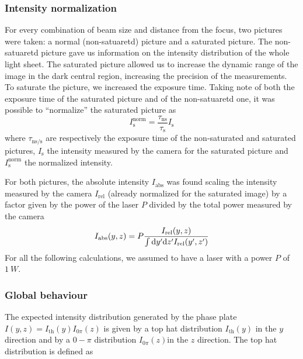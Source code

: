 \subsubsection{Intensity normalization}

For every combination of beam size and distance from the focus, two pictures were taken: a normal (non-satuaretd) picture and a saturated picture. The non-satuaretd picture gave us information on the intensity distribution of the whole light sheet. The saturated picture allowed us to increase the dynamic range of the image in the dark central region, increasing the precision of the measurements.
To saturate the picture, we increased the exposure time. Taking note of both the exposure time of the saturated picture and of the non-satuaretd one, it was possible to \enquote{normalize} the saturated picture as
\begin{equation}
    I_\text{s}^\text{norm} = \frac{\tau_\text{ns}}{\tau_\text{s}} I_\text{s}
\end{equation}
where $\tau_\text{ns/s}$ are respectively the exposure time of the non-saturated and saturated pictures, $I_\text{s}$ the intensity measured by the camera for the saturated picture and $I_\text{s}^\text{norm}$ the normalized intensity.

For both pictures, the absolute intensity $I_\text{abs}$ was found scaling the intensity measured by the camera $I_\text{rel}$ (already normalized for the saturated image) by a factor given by the power of the laser $P$ divided by the total power measured by the camera
\begin{equation}
    I_\text{abs}(y,z) = P\frac{I_\text{rel}(y,z)}{
        \int \differential y' \differential z' I_\text{rel}(y',z')}
\end{equation}
For all the following calculations, we assumed to have a laser with a power $P$ of $\SI{1}{W}$.

\subsubsection{Global behaviour}
The expected intensity distribution generated by the phase plate $I(y,z) = I_\text{th}(y) I_{0\pi}(z)$ is given by a top hat distribution $I_\text{th}(y)$ in the $y$ direction and by a $0-\pi$ distribution $I_{0\pi}(z)$in the $z$ direction. The top hat distribution is defined as

